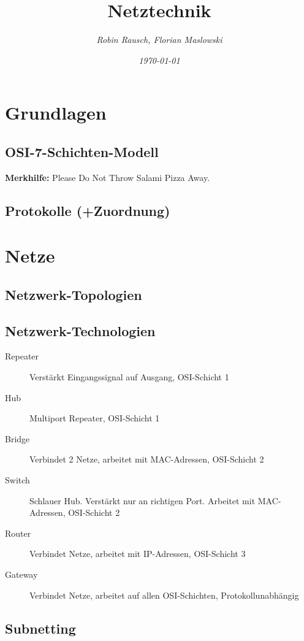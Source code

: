 \documentclass[12pt,a4paper]{article}
\title{Netztechnik}
\author{\slshape Robin Rausch, Florian Maslowski}
\date{\slshape \today}
\begin{document}
	\maketitle
	\tableofcontents
	\newpage
	\section{Grundlagen}
		\subsection{OSI-7-Schichten-Modell}
			\textbf{Merkhilfe:} Please Do Not Throw Salami Pizza Away.\\
		\subsection{Protokolle (+Zuordnung)}

	\section{Netze}
		\subsection{Netzwerk-Topologien}

		\subsection{Netzwerk-Technologien}
			\begin{description}
				\item[Repeater] Verstärkt Eingangssignal auf Ausgang, OSI-Schicht 1
				\item[Hub] Multiport Repeater, OSI-Schicht 1
				\item[Bridge] Verbindet 2 Netze, arbeitet mit MAC-Adressen, OSI-Schicht 2 
				\item[Switch] Schlauer Hub. Verstärkt nur an richtigen Port. Arbeitet mit MAC-Adressen, OSI-Schicht 2 
				\item[Router] Verbindet Netze, arbeitet mit IP-Adressen, OSI-Schicht 3
				\item[Gateway] Verbindet Netze, arbeitet auf allen OSI-Schichten, Protokollunabhängig 
			\end{description}

		\subsection{Subnetting}
\end{document}
